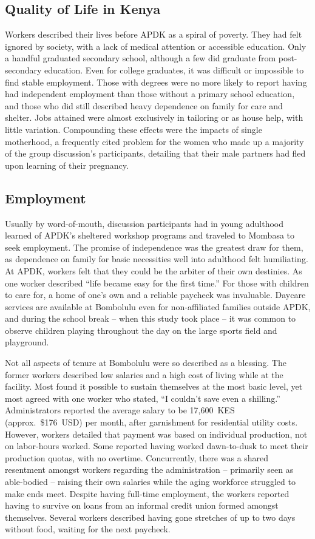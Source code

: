 \documentclass[american]{../../../coursework}
\begin{document}
\subsection{Quality of Life in Kenya}

Workers described their lives before APDK as a spiral of poverty. They had
felt ignored by society, with a lack of medical attention or accessible
education. Only a handful graduated secondary school, although a few did
graduate from post-secondary education. Even for college graduates,
it was difficult or impossible to find stable employment. Those with degrees
were no more likely to report having had independent employment than those
without a primary school education, and those who did still described heavy
dependence on family for care and shelter. Jobs attained were almost
exclusively in tailoring or as house help, with little variation. Compounding
these effects were the impacts of single motherhood, a frequently cited
problem for the women who made up a majority of the group discussion's
participants, detailing that their male partners had fled upon learning of
their pregnancy.

\subsection{Employment}

Usually by word-of-mouth, discussion participants had in young adulthood
learned of APDK's sheltered workshop programs and traveled to Mombasa to seek
employment. The promise of independence was the greatest draw for them, as
dependence on family for basic necessities well into adulthood felt
humiliating. At APDK, workers felt that they could be the arbiter of their own
destinies. As one worker described ``life became easy for the first time.''
For those with children to care for, a home of one's own and a reliable
paycheck was invaluable. Daycare services are available at Bombolulu even for
non-affiliated families outside APDK, and during the school break -- when this
study took place -- it was common to observe children playing throughout the
day on the large sports field and playground.

Not all aspects of tenure at Bombolulu were so described as a blessing. The
former workers described low salaries and a high cost of living while at the
facility. Most found it possible to sustain themselves at the most basic
level, yet most agreed with one worker who stated, ``I couldn't save even a
shilling.'' Administrators reported the average salary to be 17,600~KES
(approx.~\$176~USD) per month, after garnishment for residential utility
costs. However, workers detailed that payment was based on individual
production, not on labor-hours worked. Some reported having worked
dawn-to-dusk to meet their production quotas, with no overtime. Concurrently,
there was a shared resentment amongst workers regarding the administration --
primarily seen as able-bodied -- raising their own salaries while the aging
workforce struggled to make ends meet. Despite having full-time employment,
the workers reported having to survive on loans from an informal credit union
formed amongst themselves. Several workers described having gone stretches of
up to two days without food, waiting for the next paycheck.
\end{document}
